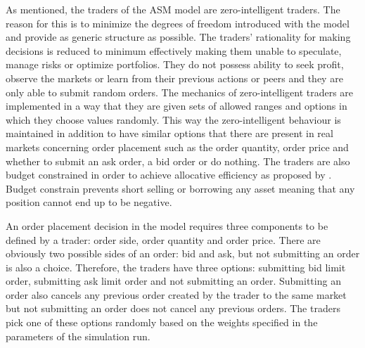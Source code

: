 As mentioned, the traders of the ASM model are zero-intelligent
traders. The reason for this is to minimize the degrees of freedom introduced with %
the model and provide as generic structure as possible. The traders' rationality 
for making decisions is reduced to minimum effectively making them unable to speculate, 
manage risks or optimize portfolios. They do not possess ability to seek profit, 
observe the markets or learn from their previous actions or peers and
they are only able to submit random orders. The mechanics of zero-intelligent traders
are implemented in a way that they are given sets of allowed ranges 
and options in which they choose values randomly. This way the zero-intelligent behaviour is maintained
in addition to have similar options that there are present in real markets 
concerning order placement such as the order quantity, order price and whether
to submit an ask order, a bid order or do nothing. The traders are also budget constrained
in order to achieve allocative efficiency as proposed by
\citet{God93}. Budget constrain prevents short selling or borrowing any asset meaning that 
any position cannot end up to be negative.


An order placement decision in the model requires three components 
to be defined by a trader: order side, order quantity and order price. 
There are obviously two possible sides of an order: bid and ask, but
not submitting an order is also a choice. Therefore, the traders
have three options: submitting bid limit order, submitting ask limit order
and not submitting an order. Submitting an order also cancels any previous
order created by the trader to the same market but not submitting an order does not
cancel any previous orders. The traders pick one of these options randomly 
based on the weights specified in the parameters of the simulation run. 

